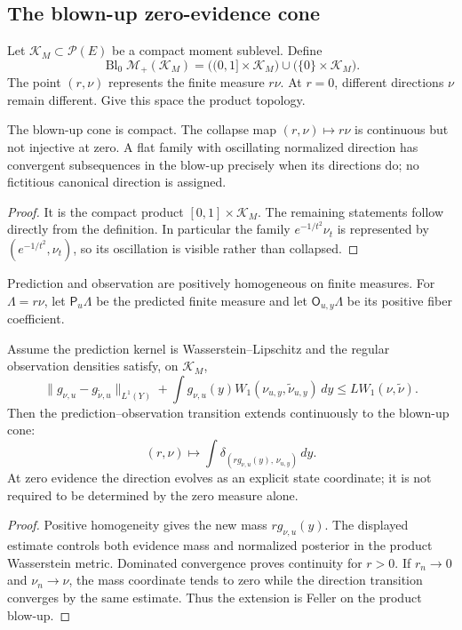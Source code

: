 \subsection{The blown-up zero-evidence cone}

Let \(\mathcal K_M\subset\mathcal P(E)\) be a compact moment sublevel.  Define
\[
 \operatorname{Bl}_0\mathcal M_+(\mathcal K_M)
 =
 \bigl((0,1]\times\mathcal K_M\bigr)
 \cup\bigl(\{0\}\times\mathcal K_M\bigr).
\]
The point \((r,\nu)\) represents the finite measure \(r\nu\).  At \(r=0\),
different directions \(\nu\) remain different.  Give this space the product
topology.

\begin{lemma}
\label{lem:r14-c1-blowup}
The blown-up cone is compact.  The collapse map
\((r,\nu)\mapsto r\nu\) is continuous but not injective at zero.  A flat
family with oscillating normalized direction has convergent subsequences in
the blow-up precisely when its directions do; no fictitious canonical
direction is assigned.
\end{lemma}

\begin{proof}
It is the compact product \([0,1]\times\mathcal K_M\).  The remaining
statements follow directly from the definition.  In particular the family
\(e^{-1/t^2}\nu_t\) is represented by
\((e^{-1/t^2},\nu_t)\), so its oscillation is visible rather than collapsed.
\end{proof}

Prediction and observation are positively homogeneous on finite measures.
For \(\Lambda=r\nu\), let \(\mathsf P_u\Lambda\) be the predicted finite
measure and let \(\mathsf O_{u,y}\Lambda\) be its positive fiber coefficient.

\begin{theorem}
\label{thm:r14-c1-feller}
Assume the prediction kernel is Wasserstein--Lipschitz and the regular
observation densities satisfy, on \(\mathcal K_M\),
\[
 \|g_{\nu,u}-g_{\tilde\nu,u}\|_{L^1(Y)}
 +\int g_{\nu,u}(y)
   W_1(\nu_{u,y},\tilde\nu_{u,y})\,dy
 \le L W_1(\nu,\tilde\nu).
\]
Then the prediction--observation transition extends continuously to the
blown-up cone:
\[
 (r,\nu)\longmapsto
 \int \delta_{(r g_{\nu,u}(y),\,\nu_{u,y})}\,dy .
\]
At zero evidence the direction evolves as an explicit state coordinate; it
is not required to be determined by the zero measure alone.
\end{theorem}

\begin{proof}
Positive homogeneity gives the new mass \(rg_{\nu,u}(y)\).
The displayed estimate controls both evidence mass and normalized posterior
in the product Wasserstein metric.  Dominated convergence proves continuity
for \(r>0\).  If \(r_n\to0\) and \(\nu_n\to\nu\), the mass coordinate tends to
zero while the direction transition converges by the same estimate.  Thus the
extension is Feller on the product blow-up.
\end{proof}

